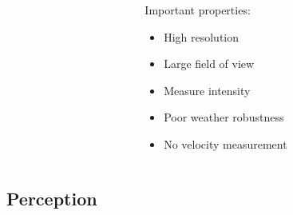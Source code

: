 \begin{frame}
\begin{columns}[T]
\begin{column}{.5\textwidth}
\begin{columns}[T]
\begin{column}{0.4\textwidth}
\begin{itemize}
                \end{itemize}
            \end{column}
            \begin{column}{0.6\textwidth}
                \footnotesize
                Important properties:
                \begin{itemize}
                    \item High resolution
                    \item Large field of view
                    \item Measure intensity
                    \item Poor weather robustness
                    \item No velocity measurement
                \end{itemize}
            \end{column}
        \end{columns}
    \end{column}
\end{columns}
\end{frame}

\subsection{Perception}

